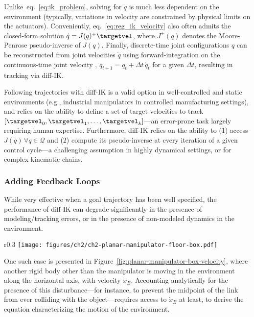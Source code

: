 Unlike~eq.~\ref{eq:ik_problem}, solving for \( \dot q \) is much less dependent on the environment (typically, variations in velocity are constrained by physical limits on the actuators).
Conveniently, eq.~\ref{eq:reg_ik_velocity} also often admits the closed-form solution \( \dot q = J(q)^+ \targetvel \), where \( J^+(q) \) denotes the Moore-Penrose pseudo-inverse of \( J(q) \).
Finally, discrete-time joint configurations \( q \) can be reconstructed from joint velocities \( \dot q \) using forward-integration on the continuous-time joint velocity , \( q_{t+1} = q_t + \Delta t\,\dot q_t \) for a given \( \Delta t \), resulting in tracking via diff-IK.

Following trajectories with diff-IK is a valid option in well-controlled and static environments (e.g., industrial manipulators in controlled manufacturing settings), and relies on the ability to define a set of target velocities to track \( [\targetvel_0, \targetvel_1, \dots, \targetvel_k ] \)---an error-prone task largely requiring human expertise.
Furthermore, diff-IK relies on the ability to (1) access \( J(q) \, \forall q \in \mathcal Q \) and (2) compute its pseudo-inverse at every iteration of a given control cycle---a challenging assumption in highly dynamical settings, or for complex kinematic chains.

\subsubsection{Adding Feedback Loops}
While very effective when a goal trajectory has been well specified, the performance of diff-IK can degrade significantly in the presence of modeling/tracking errors, or in the presence of non-modeled dynamics in the environment.

\begin{wrapfigure}[12]{r}{0.3\textwidth}
    \vspace{-\intextsep}
    \centering
    \texttt{[image: figures/ch2/ch2-planar-manipulator-floor-box.pdf]}
    \caption{Planar manipulator robot in the presence of a moving obstacle.}
    \label{fig:planar-manipulator-box-velocity}
\end{wrapfigure}

One such case is presented in Figure~\ref{fig:planar-manipulator-box-velocity}, where another rigid body other than the manipulator is moving in the environment along the horizontal axis, with velocity \( \dot x_B \).
Accounting analytically for the presence of this disturbance---for instance, to prevent the midpoint of the link from ever colliding with the object---requires access to \( \dot x_B \) at least, to derive the equation characterizing the motion of the environment.

